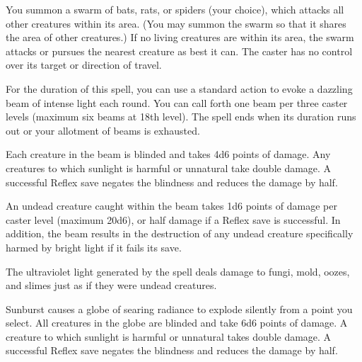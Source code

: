 \begin{multicols}{2}
\begin{small}
\noindent You summon a swarm of bats, rats, or spiders (your choice), which attacks all other creatures within its area. (You may summon the swarm so that it shares the area of other creatures.) If no living creatures are within its area, the swarm attacks or pursues the nearest creature as best it can. The caster has no control over its target or direction of travel.


\noindent For the duration of this spell, you can use a standard action to evoke a dazzling beam of intense light each round. You can call forth one beam per three caster levels (maximum six beams at 18th level). The spell ends when its duration runs out or your allotment of beams is exhausted.

\smallskip\noindent Each creature in the beam is blinded and takes 4d6 points of damage. Any creatures to which sunlight is harmful or unnatural take double damage. A successful Reflex save negates the blindness and reduces the damage by half.

\smallskip\noindent An undead creature caught within the beam takes 1d6 points of damage per caster level (maximum 20d6), or half damage if a Reflex save is successful. In addition, the beam results in the destruction of any undead creature specifically harmed by bright light if it fails its save.

\smallskip\noindent The ultraviolet light generated by the spell deals damage to fungi, mold, oozes, and slimes just as if they were undead creatures.

\noindent Sunburst causes a globe of searing radiance to explode silently from a point you select. All creatures in the globe are blinded and take 6d6 points of damage. A creature to which sunlight is harmful or unnatural takes double damage. A successful Reflex save negates the blindness and reduces the damage by half.


\end{small}
\end{multicols}
